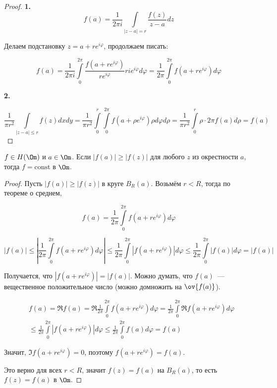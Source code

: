 \begin{proof}
    \textbf{1.}
    \[
        f(a) = \frac{1}{2\pi i}
        \int\limits_{|z-a| = r} \frac{f(z)}{z-a}dz
    \]

    Делаем подстановку $z = a+re^{i\varphi}$,
    продолжаем писать:

    \[
        f(a) = \frac{1}{2\pi i}
        \int\limits_0^{2\pi} \frac{f(a+re^{i\varphi})}{re^{i\varphi}}
        rie^{i\varphi}d\varphi =
        \frac{1}{2\pi}
        \int\limits_0^{2\pi} f(a+re^{i\varphi})d\varphi
    \]

    \textbf{2.}

    \[
        \frac{1}{\pi r^2}
        \int\limits_{|z-a| \le r} f(z)dxdy =
        \frac{1}{\pi r^2}
        \int\limits_0^r\int\limits_0^{2\pi}
        f(a+\rho e^{i\varphi})\rho d\varphi d\rho
        = \frac{1}{\pi r^2} \int\limits_0^r \rho
        \cdot 2\pi f(a) d\rho = f(a)
    \]
\end{proof}

\begin{theorem}

    $f\in H(\Om)$ и $a \in \Om$.
    Если $|f(a)| \ge |f(z)|$ для любого
    $z$ из окрестности $a$, тогда
    $f = \mathrm{const}$ в $\Om$.
\end{theorem}

\begin{proof}
    Пусть $|f(a)| \ge |f(z)|$
    в круге $B_R(a)$.
    Возьмём $r < R$, тогда по теореме о среднем,

    \[
        f(a) = \frac{1}{2\pi} \int\limits_0^{2\pi}
        f(a+re^{i\varphi})d\varphi
    \]

    \[
        |f(a)| \le \left| \frac{1}{2\pi} \int\limits_0^{2\pi}
        f(a+re^{i\varphi})d\varphi \right|
        \le \frac{1}{2\pi} \int\limits_0^{2\pi}
        \left| f(a+re^{i\varphi}) \right| d\varphi
        \le \frac{1}{2\pi} \int\limits_0^{2\pi} \left| f(a)\right| d\varphi = |f(a)|
    \]

    Получается, что $|f(a+re^{i\varphi})| = |f(a)|$.
    Можно думать, что $f(a)$~--- вещественное положительное
    число (можно домножить на $\ov{f(a)}$).

    \[
        \begin{aligned}
             & f(a) = \Re f(a) = \Re \frac{1}{2\pi}
            \int\limits_0^{2\pi} f(a+re^{i\varphi}) d\varphi
            =  \frac{1}{2\pi}
            \int\limits_0^{2\pi} \Re f(a+re^{i\varphi}) d\varphi
            \\
             & \le  \frac{1}{2\pi}
            \int\limits_0^{2\pi}\left| f(a+re^{i\varphi})\right| d\varphi
            \le \frac{1}{2\pi}
            \int\limits_0^{2\pi} f(a)d\varphi = f(a)
        \end{aligned}
    \]

    Значит, $\Im f(a+re^{i\varphi}) = 0$,
    поэтому $f(a+re^{i\varphi}) = f(a)$.

    Это верно для всех $r < R$,
    значит $f(z) = f(a)$ на $B_R(a)$,
    то есть $f(z) = f(a)$ в $\Om$.
\end{proof}

